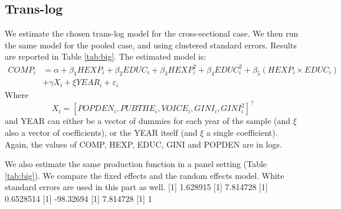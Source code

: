 \documentclass[12pt,a4paper]{article}\usepackage[]{graphicx}\usepackage[]{color}
\begin{document}
\subsection{Trans-log}
We estimate the chosen trans-log model for the cross-sectional case. We then run the same model for the pooled case, and using clustered standard errors. Results are reported in Table \ref{tab:big}. The estimated model is:
\begin{equation}
\begin{aligned}
COMP_i &= \alpha + \beta_1 HEXP_i + \beta_2 EDUC_i + \beta_3 HEXP_i^2 + \beta_4 EDUC_i^2 + \beta_5 \left(HEXP_i \times EDUC_i\right) \\ &+ \gamma X_i + \xi YEAR_i + \varepsilon_i
\end{aligned}
\end{equation}
Where $$ X_i = \left[ POPDEN_i, PUBTHE_i, VOICE_i, GINI_i, GINI_i^2 \right]^\top$$ and YEAR can either be a vector of dummies for each year of the sample (and $\xi$ also a vector of coefficients), or the YEAR itself (and $\xi$ a single coefficient). Again, the values of COMP, HEXP, EDUC, GINI and POPDEN are in logs.


We also estimate the same production function in a panel setting (Table \ref{tab:big}). We compare the fixed effects and the random effects model. White standard errors are used in this part as well.
[1] 1.628915
[1] 7.814728
[1] 0.6528514
[1] -98.32694
[1] 7.814728
[1] 1
\end{document}
